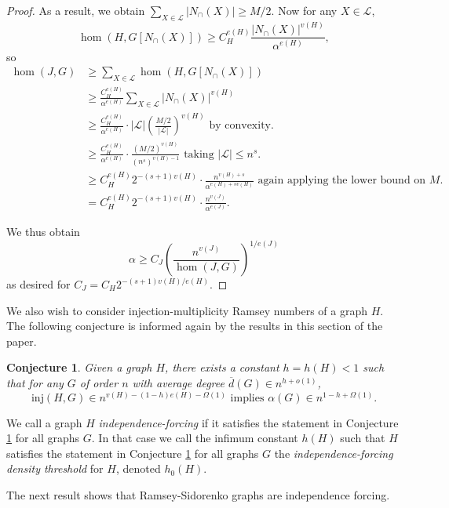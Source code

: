\documentclass[12pt]{article}
\newtheorem{conjecture}[theorem]{Conjecture}
\newcommand{\inj}{\mathrm{inj}}
\begin{document}
\begin{proof}
As a result, we obtain $\sum_{X\in\mathcal L}|N_\cap(X)|\geq M/2$. Now for any $X\in\mathcal{L}$, 
\[
\hom(H,G[N_\cap(X)])\geq C_H^{e(H)}\frac{|N_\cap(X)|^{v(H)}}{\alpha^{e(H)}},
\]
so
\begin{align*}
    \hom(J,G)&\geq\sum_{X\in\mathcal{L}}\hom(H,G[N_\cap(X)])\\
    &\geq\frac{C_H^{e(H)}}{\alpha^{e(H)}}\sum_{X\in\mathcal L}|N_\cap(X)|^{v(H)}\\
    &\geq\frac{C_H^{e(H)}}{\alpha^{e(H)}}\cdot|\mathcal L|\left(\frac{M/2}{|\mathcal L|}\right)^{v(H)}\text{ by convexity.}\\
    &\geq\frac{C_H^{e(H)}}{\alpha^{e(H)}}\cdot\frac{(M/2)^{v(H)}}{(n^{s})^{v(H)-1}}\text{ taking }|\mathcal L|\leq n^s.\\
    &\geq C_H^{e(H)}2^{-(s+1)v(H)}\cdot\frac{n^{v(H)+s}}{\alpha^{e(H)+sv(H)}}\text{ again applying the lower bound on $M$.}\\
    &=C_H^{e(H)}2^{-(s+1)v(H)}\cdot\frac{n^{v(J)}}{\alpha^{e(J)}}.
\end{align*}

\noindent We thus obtain
\[
\alpha\geq C_J\left(\frac{n^{v(J)}}{\hom(J,G)}\right)^{1/e(J)}
\]
as desired for $C_J=C_H2^{-(s+1)v(H)/e(H)}$.
\end{proof}





We also wish to consider injection-multiplicity Ramsey numbers of a graph $H$. The following conjecture is informed again by the results in this section of the paper.
\begin{conjecture}
\label{conj: independence-forcing}
    Given a graph $H$, there exists a constant $h=h(H)<1$ such that for any $G$ of order $n$ with average degree $\overline d(G)\in n^{h+o(1)}$,
    \[
    \inj(H,G)\in n^{v(H)-(1-h)e(H)-\Omega(1)}\text{ implies } \alpha(G)\in n^{1-h+\Omega(1)}.
    \]
\end{conjecture}

We call a graph $H$ \textit{independence-forcing} if it satisfies the statement in Conjecture \ref{conj: independence-forcing} for all graphs $G$. In that case we  call the infimum constant $h(H)$ such that $H$ satisfies the statement in Conjecture \ref{conj: independence-forcing} for all graphs $G$ the \textit{independence-forcing density threshold} for $H$, denoted $h_0(H)$.

The next result shows that Ramsey-Sidorenko graphs are  independence forcing.
\end{document}
